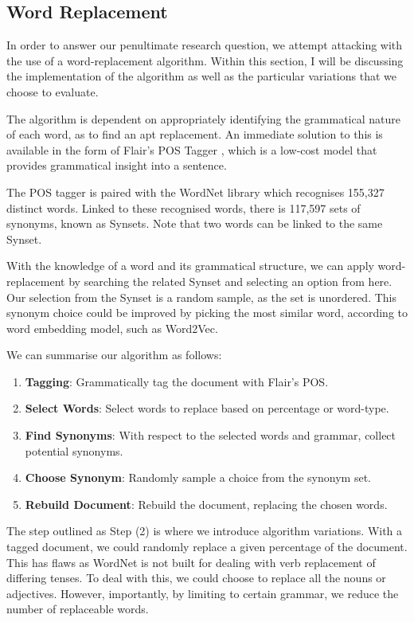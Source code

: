 \documentclass{l4proj}
\theoremstyle{definition}
\begin{document}
    \subsection{Word Replacement}
        In order to answer our penultimate research question, we attempt attacking with the use of a word-replacement algorithm. Within this section, I will be discussing the implementation of the algorithm as well as the particular variations that we choose to evaluate.

        The algorithm is dependent on appropriately identifying the grammatical nature of each word, as to find an apt replacement. An immediate solution to this is available in the form of Flair's POS Tagger \citep{akbik2018coling}, which is a low-cost model that provides grammatical insight into a sentence.

        The POS tagger is paired with the WordNet \citep{wordnet1998fellbaum} library which recognises 155,327 distinct words. Linked to these recognised words, there is 117,597 sets of synonyms, known as Synsets. Note that two words can be linked to the same Synset. 

        With the knowledge of a word and its grammatical structure, we can apply word-replacement by searching the related Synset and selecting an option from here. Our selection from the Synset is a random sample, as the set is unordered. This synonym choice could be improved by picking the most similar word, according to word embedding model, such as Word2Vec.

        We can summarise our algorithm as follows:
        \begin{enumerate}
            \item \textbf{Tagging}: Grammatically tag the document with Flair's POS.
            \item \textbf{Select Words}: Select words to replace based on percentage or word-type.
            \item \textbf{Find Synonyms}: With respect to the selected words and grammar, collect potential synonyms.
            \item \textbf{Choose Synonym}: Randomly sample a choice from the synonym set.
            \item \textbf{Rebuild Document}: Rebuild the document, replacing the chosen words.
        \end{enumerate}

        The step outlined as Step (2) is where we introduce algorithm variations. With a tagged document, we could randomly replace a given percentage of the document. This has flaws as WordNet is not built for dealing with verb replacement of differing tenses. To deal with this, we could choose to replace all the nouns or adjectives. However, importantly, by limiting to certain grammar, we reduce the number of replaceable words.
\end{document}
